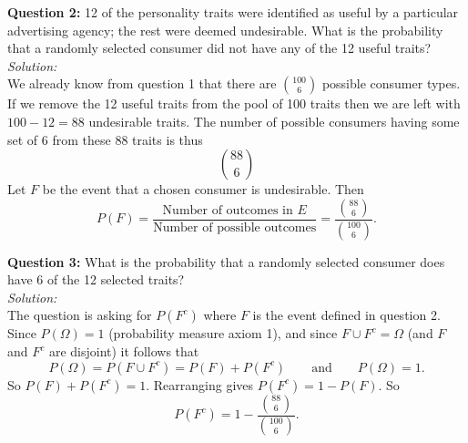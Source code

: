\noindent \textbf{Question 2:} 12 of the personality traits were identified as useful by a particular advertising agency; the rest were deemed undesirable. What is the probability that a randomly selected consumer did not have any of the 12 useful traits? \\

\noindent \textit{Solution:} \\
We already know from question 1 that there are $\binom{100}{6}$ possible consumer types. If we remove the 12 useful traits from the pool of 100 traits then we are left with $100 - 12 = 88$ undesirable traits. The number of possible consumers having some set of 6 from these 88 traits is thus
\[
\binom{88}{6}
\]
Let $F$ be the event that a chosen consumer is undesirable. Then
\[
P(F) = \frac{\text{Number of outcomes in $E$}}{\text{Number of possible outcomes}} = \frac{\binom{88}{6}}{\binom{100}{6}}.
\]

\noindent \textbf{Question 3:} What is the probability that a randomly selected consumer does have 6 of the 12 selected traits? \\
\noindent \textit{Solution:} \\
The question is asking for $P(F^c)$ where $F$ is the event defined in question 2. Since $P(\Omega) = 1$ (probability measure axiom 1), and since $F \cup F^c = \Omega$ (and $F$ and $F^c$ are disjoint) it follows that
\[
P(\Omega) = P(F \cup F^c) = P(F) + P(F^c) \qquad \text{and} \qquad P(\Omega) = 1.
\]
So $P(F) + P(F^c) = 1.$ Rearranging gives $P(F^c) = 1 - P(F)$. So
\[
P(F^c) = 1 - \frac{\binom{88}{6}}{\binom{100}{6}}. \tag{using the result from question 2}
\]

